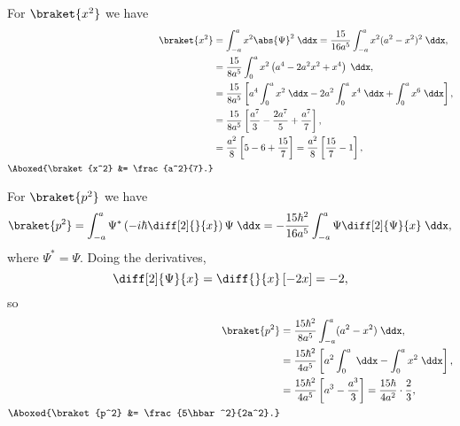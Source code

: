 \begin{parts}
    \item For $\braket{x^2}$ we have
        \begin{align*}
            \braket{x^2} &= \int_{-a}^{a} x^2 \abs{\Psi}^2 \;\ddx = \frac{15}{16a^5} \int_{-a}^{a} x^2 (a^2 - x^2)^2 \;\ddx, \\
            &= \frac{15}{8a^5} \int_0^a x^2\left(a^4 -2a^2x^2 + x^4\right) \;\ddx, \\
            &= \frac{15}{8a^5} \left[a^4\int_0^a x^2 \;\ddx - 2a^2 \int_0^a x^4 \;\ddx + \int_0^a x^6 \;\ddx \right], \\
            &= \frac{15}{8a^5} \left[\frac{a^7}{3} - \frac{2a^7}{5} + \frac{a^7}{7}\right], \\
            &= \frac{a^2}{8} \left[5-6 + \frac{15}{7}\right] = \frac{a^2}{8} \left[\frac{15}{7} - 1\right], \\
            \Aboxed{\braket{x^2} &= \frac{a^2}{7}.}
        \end{align*}

    \item For $\braket{p^2}$ we have
        \begin{equation*}
            \braket{p^2} = \int_{-a}^{a} \Psi^* \left(-i\hbar \diff[2]{}{x}\right) \Psi \;\ddx = -\frac{15\hbar^2}{16a^5} \int_{-a}^{a} \Psi \diff[2]{\Psi}{x} \;\ddx,
        \end{equation*}
        where $\Psi^* = \Psi$. Doing the derivatives,
        \begin{equation*}
            \diff[2]{\Psi}{x} = \diff{}{x} \left[-2x\right] = -2,
        \end{equation*}
        so
        \begin{align*}
            \braket{p^2} &= \frac{15\hbar^2}{8a^5} \int_{-a}^{a}(a^2 - x^2) \;\ddx, \\
            &= \frac{15\hbar^2}{4a^5} \left[a^2 \int_0^a \;\ddx - \int_0^a x^2 \;\ddx\right], \\
            &= \frac{15\hbar^2}{4a^5} \left[a^3 - \frac{a^3}{3}\right] = \frac{15\hbar}{4a^2} \cdot \frac{2}{3}, \\
            \Aboxed{\braket{p^2} &= \frac{5\hbar^2}{2a^2}.}
        \end{align*}
    

\end{parts}

